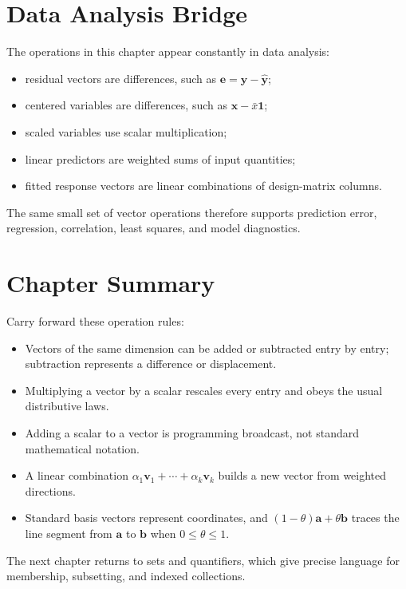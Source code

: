 \section{Data Analysis Bridge}
\label{mf:ch03-data-analysis-bridge}

The operations in this chapter appear constantly in data analysis:
\begin{itemize}
    \item residual vectors are differences, such as \(\mathbf{e}=\mathbf{y}-\widehat{\mathbf{y}}\);
    \item centered variables are differences, such as \(\mathbf{x}-\bar{x}\mathbf{1}\);
    \item scaled variables use scalar multiplication;
    \item linear predictors are weighted sums of input quantities;
    \item fitted response vectors are linear combinations of design-matrix columns.
\end{itemize}
The same small set of vector operations therefore supports prediction error, regression, correlation, least squares, and model diagnostics.

\section{Chapter Summary}
\label{mf:vector-operations-summary}

Carry forward these operation rules:
\begin{itemize}
    \item Vectors of the same dimension can be added or subtracted entry by entry; subtraction represents a difference or displacement.
    \item Multiplying a vector by a scalar rescales every entry and obeys the usual distributive laws.
    \item Adding a scalar to a vector is programming broadcast, not standard mathematical notation.
    \item A linear combination \(\alpha_1\mathbf{v}_1+\cdots+\alpha_k\mathbf{v}_k\) builds a new vector from weighted directions.
    \item Standard basis vectors represent coordinates, and \((1-\theta)\mathbf{a}+\theta\mathbf{b}\) traces the line segment from \(\mathbf{a}\) to \(\mathbf{b}\) when \(0\leq \theta\leq 1\).
\end{itemize}

The next chapter returns to sets and quantifiers, which give precise language for membership, subsetting, and indexed collections.

